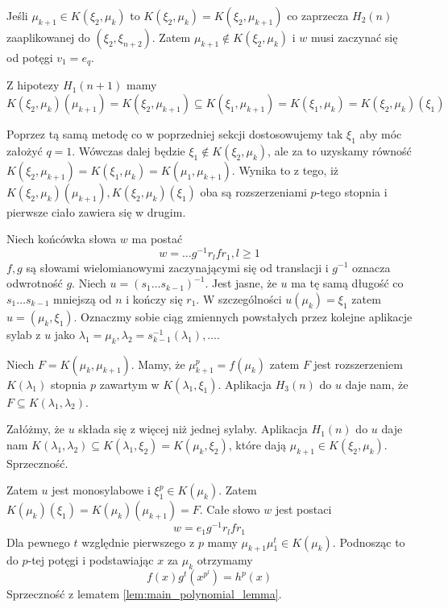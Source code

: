 Jeśli $\mu_{k+1} \in K\left(\xi_2, \mu_k\right)$ to $K\left(\xi_2, \mu_k\right)
= K\left(\xi_2, \mu_{k+1}\right)$ co zaprzecza $H_2(n)$ zaaplikowanej do
$\left(\xi_2, \xi_{n+2}\right)$. Zatem $\mu_{k+1} \not \in K\left(\xi_2,
\mu_k\right)$ i $w$ musi zaczynać się od potęgi $v_1 = e_q$.

Z hipotezy $H_1(n+1)$ mamy
\[
  K\left(\xi_2, \mu_k\right) \left(\mu_{k+1}\right)
  =
  K\left(\xi_2, \mu_{k+1}\right)
  \subseteq
  K\left(\xi_1, \mu_{k+1}\right)
  =
  K\left(\xi_1, \mu_{k}\right)
  =
  K\left(\xi_2, \mu_{k}\right)\left(\xi_1\right)
\]

Poprzez tą samą metodę co w poprzedniej sekcji dostosowujemy tak $\xi_1$ aby móc
założyć $q = 1$. Wówczas dalej będzie $\xi_1 \not \in K\left(\xi_2,
\mu_k\right)$, ale za to uzyskamy równość
$K\left(\xi_2, \mu_{k+1}\right)
= K\left(\xi_1, \mu_k\right)
= K\left(\mu_1, \mu_{k+1}\right)$. Wynika to z tego, iż
$
K\left(\xi_2, \mu_{k}\right) \left(\mu_{k+1}\right),
K\left(\xi_2, \mu_{k}\right) \left(\xi_{1}\right)$ oba są rozszerzeniami
$p$-tego stopnia i pierwsze ciało zawiera się w drugim.

Niech końcówka słowa $w$ ma postać
\begin{equation}
w = \ldots g^{-1}r_lfr_1, l \geq 1
\label{eq:h_2_w_ending}
\end{equation}
$f, g$ są słowami wielomianowymi zaczynającymi się od translacji i $g^{-1}$
oznacza odwrotność $g$. Niech $u = \left(s_1 \ldots s_{k-1}\right)^{-1}$. Jest
jasne, że $u$ ma tę samą długość co $s_1\ldots s_{k-1}$ mniejszą od $n$ i kończy
się $r_1$. W szczególności $u\left(\mu_k\right) = \xi_1$ zatem $u = \left(\mu_k,
\xi_1\right)$. Oznaczmy sobie ciąg zmiennych powstałych przez kolejne aplikacje
sylab z $u$ jako $\lambda_1 = \mu_k, \lambda_2 =
s_{k-1}^{-1}\left(\lambda_1\right), \ldots$.

Niech $F = K \left(\mu_k, \mu_{k+1}\right)$. Mamy, że
$\mu_{k+1}^p = f\left(\mu_k\right)$ zatem $F$ jest rozszerzeniem
$K\left(\lambda_1 \right)$ stopnia $p$ zawartym w $K \left( \lambda_1, \xi_1
\right)$.
Aplikacja $H_3(n)$ do $u$ daje nam, że $F \subseteq K \left( \lambda_1,
\lambda_2 \right)$.

Załóżmy, że $u$ składa się z więcej niż jednej sylaby. Aplikacja $H_1(n)$ do $u$
daje nam
$K \left( \lambda_1, \lambda_2 \right) \subseteq K \left( \lambda_1, \xi_2
\right) = K \left( \mu_k, \xi_2 \right)$, które dają $\mu_{k+1} \in K\left(
\xi_2, \mu_k \right)$. Sprzeczność.

Zatem $u$ jest monosylabowe i $\xi_1^p \in K \left( \mu_k\right)$. Zatem
$K \left( \mu_k \right) \left(\xi_1 \right) = K \left(\mu_k \right)
\left(\mu_{k+1} \right) = F$. Całe słowo $w$ jest postaci
\[w = e_1 g^{-1}r_lfr_1\]
Dla pewnego $t$ względnie pierwszego z $p$ mamy $\mu_{k+1} \mu_1^t \in K \left(
\mu_k \right)$.  Podnosząc to do $p$-tej potęgi i podstawiając $x$ za $\mu_k$
otrzymamy
\[f(x)g^t \left( x^{p^l} \right) = h^p(x)\]
Sprzeczność z lematem \ref{lem:main_polynomial_lemma}.

